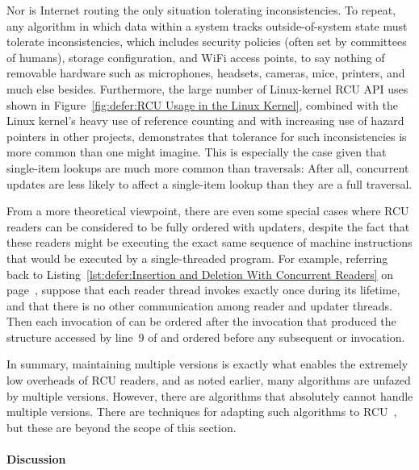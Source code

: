 Nor is Internet routing the only situation tolerating inconsistencies.
To repeat, any algorithm in which data within a system tracks
outside-of-system state must tolerate inconsistencies, which includes
security policies (often set by committees of humans), storage configuration,
and WiFi access points, to say nothing of removable hardware such as
microphones, headsets, cameras, mice, printers, and much else besides.
Furthermore, the large number of Linux-kernel RCU API uses shown in
Figure~\ref{fig:defer:RCU Usage in the Linux Kernel},
combined with the Linux kernel's heavy use of reference counting
and with increasing use of hazard pointers in other projects, demonstrates
that tolerance for such inconsistencies is more common than one might
imagine.
This is especially the case given that single-item lookups are much more
common than traversals:  After all, concurrent updates are less likely
to affect a single-item lookup than they are a full traversal.

From a more theoretical viewpoint, there are even some special cases where
RCU readers can be considered to be fully ordered with updaters, despite
the fact that these readers might be executing the exact same sequence of
machine instructions that would be executed by a single-threaded program.
For example, referring back to
Listing~\ref{lst:defer:Insertion and Deletion With Concurrent Readers}
on page~\pageref{lst:defer:Insertion and Deletion With Concurrent Readers},
suppose that each reader thread invokes  exactly
once during its lifetime, and that there is no other communication among
reader and updater threads.
Then each invocation of  can be ordered after the
 invocation that produced the  structure
accessed by line~9 of  and ordered before any subsequent
 or  invocation.

In summary, maintaining multiple versions is exactly what enables the
extremely low overheads of RCU readers, and as noted earlier, many
algorithms are unfazed by multiple versions.
However, there are algorithms that absolutely cannot handle multiple versions.
There are techniques for adapting such algorithms to
RCU~\cite{PaulEdwardMcKenneyPhD},
but these are beyond the scope of this section.

\paragraph{Discussion}
\label{sec:defer:Discussion}

